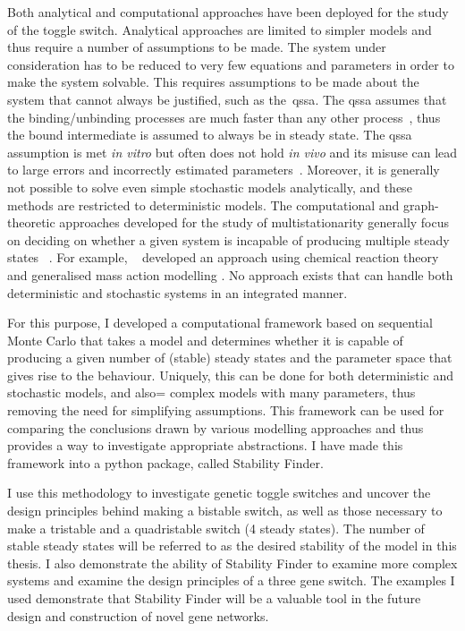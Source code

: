 Both analytical and computational approaches have been deployed for the study of the toggle switch. Analytical approaches are limited to simpler models and thus require a number of assumptions to be made. The system under consideration has to be reduced to very few equations and parameters in order to make the system solvable. This requires assumptions to be made about the system that cannot always be justified, such as the~\acrfull{qssa}. The \acrshort{qssa} assumes that the binding/unbinding processes are much faster than any other process~\autocite{Loinger:2007vo}, thus the bound intermediate is assumed to always be in steady state. The \acrshort{qssa} assumption is met \textit{in vitro} but often does not hold \textit{in vivo} and its misuse can lead to large errors and incorrectly estimated parameters~\autocite{Pedersen:2007ke}. Moreover, it is generally not possible to solve even simple stochastic models analytically, and these methods are restricted to deterministic models. The computational and graph-theoretic approaches developed for the study of multistationarity generally focus on deciding on whether a given system is incapable of producing multiple steady states ~\autocite{Conradi:2007jo, Banaji:2010fh,Feliu:2013dz}. For example, ~\textcite{Feliu:2013dz} developed an approach using chemical reaction theory and generalised mass action modelling \autocite{Feliu:2013dz}. No approach exists that can handle both deterministic and stochastic systems in an integrated manner.

For this purpose, I developed a computational framework based on sequential Monte Carlo that takes a model and determines whether it is capable of producing a given number of (stable) steady states and the parameter space that gives rise to the behaviour. Uniquely, this can be done for both deterministic and stochastic models, and also= complex models with many parameters, thus removing the need for simplifying assumptions. This framework can be used for comparing the conclusions drawn by various modelling approaches and thus provides a way to investigate appropriate abstractions. I have made this framework into a python package, called Stability Finder. 

I use this methodology to investigate genetic toggle switches and uncover the design principles behind making a bistable switch, as well as those necessary to make a tristable and a quadristable switch (4 steady states). The number of stable steady states will be referred to as the desired stability of the model in this thesis. I also demonstrate the ability of Stability Finder to examine more complex systems and examine the design principles of a three gene switch. The examples I used demonstrate that Stability Finder will be a valuable tool in the future design and construction of novel gene networks. 




